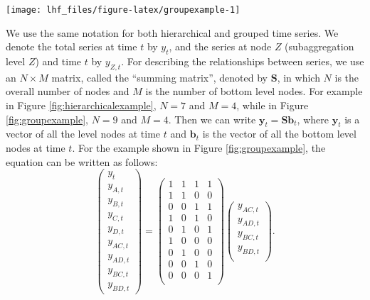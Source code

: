 \documentclass[11pt,a4paper,]{article}
\let\origfigure\figure
\let\endorigfigure\endfigure
\renewenvironment{figure}[1][2] {
    \expandafter\origfigure\expandafter[!htbp]
} {
    \endorigfigure
}
\begin{document}
\begin{figure}

{\centering \texttt{[image: lhf\_files/figure-latex/groupexample-1]}

}

\caption{An example of a two level grouped structure.}\label{fig:groupexample}
\end{figure}

We use the same notation \autocite[following][]{fpp2} for both hierarchical and grouped time series. We denote the total series at time \(t\) by \(y_t\), and the series at node \(Z\) (subaggregation level \(Z\)) and time \(t\) by \(y_{Z,t}\). For describing the relationships between series, we use an \(N\times M\) matrix, called the ``summing matrix'', denoted by \(\bm{S}\), in which \(N\) is the overall number of nodes and \(M\) is the number of bottom level nodes. For example in Figure \ref{fig:hierarchicalexample}, \(N = 7\) and \(M = 4\), while in Figure \ref{fig:groupexample}, \(N=9\) and \(M=4\). Then we can write \(\bm{y}_t=\bm{S}\bm{b}_t\), where \(\bm{y}_t\) is a vector of all the level nodes at time \(t\) and \(\bm{b}_t\) is the vector of all the bottom level nodes at time \(t\). For the example shown in Figure \ref{fig:groupexample}, the equation can be written as follows:
\begin{equation}\label{eq:Smatrixexample}
  \begin{pmatrix}
    y_{t}\\y_{A,t}\\y_{B,t}\\y_{C,t}\\y_{D,t}\\y_{AC,t}\\y_{AD,t}\\y_{BC,t}\\y_{BD,t}
  \end{pmatrix} =
  \begin{pmatrix}
    1&1&1&1\\1&1&0&0\\0&0&1&1\\1&0&1&0\\0&1&0&1\\1&0&0&0\\0&1&0&0\\0&0&1&0\\0&0&0&1\\
  \end{pmatrix}
  \begin{pmatrix}
    y_{AC,t}\\y_{AD,t}\\y_{BC,t}\\y_{BD,t}\\
  \end{pmatrix}.
\end{equation}
\end{document}
